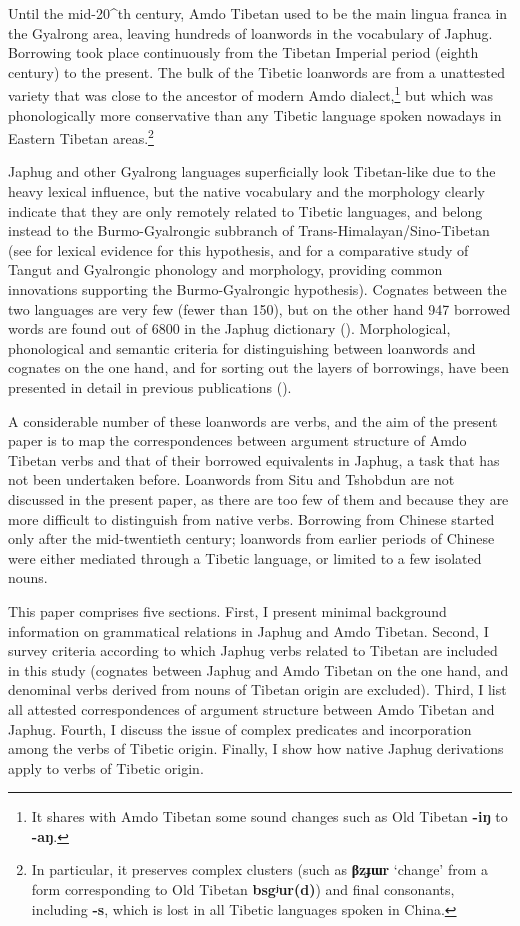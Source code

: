 \documentclass[oneside,a4paper,11pt]{article}
\newcommand{\ipa}[1]{{\phon\textbf{\mbox{#1}}}} %
\begin{document}
Until the mid-20^{th} century, Amdo Tibetan used to be the main lingua franca in the Gyalrong area, leaving hundreds of loanwords in the vocabulary of Japhug. Borrowing took place continuously from the Tibetan Imperial period (eighth century) to the present. The bulk of the Tibetic loanwords are from a unattested variety that was close to the ancestor of modern Amdo dialect,\footnote{It shares with Amdo Tibetan some sound changes such as Old Tibetan \ipa{-iŋ} to \ipa{-aŋ}. } but which was phonologically more conservative than any Tibetic language spoken nowadays in Eastern Tibetan areas.\footnote{In particular, it preserves complex clusters (such as \ipa{βzɟɯr} `change' from a form corresponding to Old Tibetan \ipa{bsgʲur(d)}) and final consonants, including \ipa{-s}, which is lost in all Tibetic languages spoken in China.} 

Japhug and other Gyalrong languages superficially look Tibetan-like due to the heavy lexical influence, but the native vocabulary and the morphology clearly indicate that they are only remotely related to Tibetic languages, and belong instead to the Burmo-Gyalrongic subbranch of Trans-Himalayan/Sino-Tibetan (see \citealt{jacques.michaud11naish} for lexical evidence for this hypothesis, and \citealt{jacques14esquisse} for a comparative study of Tangut and Gyalrongic phonology and morphology, providing common innovations supporting the Burmo-Gyalrongic hypothesis). Cognates between the two languages are very few (fewer than 150), but on the other hand 947 borrowed words are found out of 6800 in the Japhug dictionary (\citealt{jacques15japhug}). Morphological, phonological and semantic criteria for distinguishing between loanwords and cognates on the one hand, and for sorting out the layers of borrowings, have been presented in detail in previous publications (\citealt[83-200]{jacques04these}). 

A considerable number of these loanwords are verbs, and the aim of the present paper is to map the correspondences between argument structure of Amdo Tibetan verbs and that of their borrowed equivalents in Japhug, a task that has not been undertaken before. Loanwords from Situ and Tshobdun are not discussed in the present paper, as there are too few of them and because they are more difficult to distinguish from native verbs. Borrowing from Chinese started only after the mid-twentieth century; loanwords from earlier periods of Chinese were either mediated through a Tibetic language, or limited to a few isolated nouns.

This paper comprises five sections. First, I present minimal background information on grammatical relations in Japhug and Amdo Tibetan. Second, I survey criteria according to which Japhug verbs related to Tibetan are included in this study (cognates between Japhug and Amdo Tibetan on the one hand, and denominal verbs derived from nouns of Tibetan origin are excluded). Third, I list all attested correspondences of argument structure between Amdo Tibetan and Japhug. Fourth, I discuss the issue of complex predicates and incorporation among the verbs of Tibetic origin. Finally, I show how native Japhug derivations apply to verbs of Tibetic origin.
\end{document}
